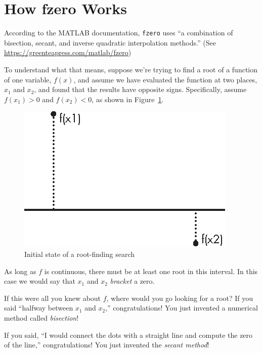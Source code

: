 

\section{How fzero Works}
\label{howfzero}

According to the MATLAB documentation, \lstinline{fzero} uses ``a combination of bisection, secant, and inverse quadratic interpolation methods.''  (See \url{https://greenteapress.com/matlab/fzero})


To understand what that means, suppose we're trying to find a root of a function of one variable, $f(x)$, and assume we have evaluated the function at two places, $x_1$ and $x_2$, and found that the results have opposite signs.  Specifically, assume $f(x_1) > 0$ and $f(x_2) < 0$, as shown in Figure~\ref{fig:secant}.

\begin{figure}[h]
\includegraphics{images/figure15_03_new.eps}
\caption{Initial state of a root-finding search}
\label{fig:secant}
\end{figure}

As long as $f$ is continuous, there must be at least one root in this interval.
In this case we would say that $x_1$ and $x_2$ \emph{bracket} a zero.


If this were all you knew about $f$, where would you go looking for
a root?  If you said ``halfway between $x_1$ and $x_2$,''
congratulations!  You just invented a numerical method called
\emph{bisection}!

If you said, ``I would connect the dots with a straight line
and compute the zero of the line,''
congratulations!  You just invented the \emph{secant method}!

